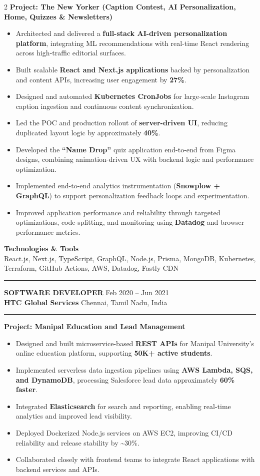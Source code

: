 \documentclass[10pt,a4paper]{article}
\newcommand{\blockdivider}{\vspace{0pt}\color{rulecolor}\rule{\linewidth}{0.5pt}\color{primary}\vspace{4pt}}
\newcommand{\roleheader}[4]{%
  \noindent
  \textbf{\MakeUppercase{#3}}%
  \hfill
  \textcolor{secondary}{#4}\\[0pt]
  \noindent
  \textbf{#1}%
  \hfill
  \textcolor{secondary}{#2}\\[0pt]
}
\newcommand{\roledivider}{%
  \vspace{-1pt}%
  {\color{rulecolor}\rule{\linewidth}{0.5pt}}%
  \vspace{2pt}%
}
\newcommand{\projecttitle}[1]{\textbf{#1}\par\vspace{2pt}}
\begin{document}
\begin{paracol}{2}
\projecttitle{Project: The New Yorker (Caption Contest, AI Personalization, Home, Quizzes \& Newsletters)}
\begin{itemize}
  \item Architected and delivered a \textbf{full-stack AI-driven personalization platform}, integrating ML recommendations with real-time React rendering across high-traffic editorial surfaces.
  \item Built scalable \textbf{React and Next.js applications} backed by personalization and content APIs, increasing user engagement by \textbf{27\%}.
  \item Designed and automated \textbf{Kubernetes CronJobs} for large-scale Instagram caption ingestion and continuous content synchronization.
  \item Led the POC and production rollout of \textbf{server-driven UI}, reducing duplicated layout logic by approximately \textbf{40\%}.
  \item Developed the \textbf{``Name Drop''} quiz application end-to-end from Figma designs, combining animation-driven UX with backend logic and performance optimization.
  \item Implemented end-to-end analytics instrumentation (\textbf{Snowplow + GraphQL}) to support personalization feedback loops and experimentation.
  \item Improved application performance and reliability through targeted optimizations, code-splitting, and monitoring using \textbf{Datadog} and browser performance metrics.
\end{itemize}

\textbf{Technologies \& Tools}\\
React.js, Next.js, TypeScript, GraphQL, Node.js, Prisma, MongoDB, Kubernetes, Terraform, GitHub Actions, AWS, Datadog, Fastly CDN

\blockdivider

\roleheader{HTC Global Services}{Chennai, Tamil Nadu, India}{Software Developer}{Feb 2020 -- Jun 2021}
\roledivider

\projecttitle{Project: Manipal Education and Lead Management}
\begin{itemize}
  \item Designed and built microservice-based \textbf{REST APIs} for Manipal University’s online education platform, supporting \textbf{50K+ active students}.
  \item Implemented serverless data ingestion pipelines using \textbf{AWS Lambda, SQS, and DynamoDB}, processing Salesforce lead data approximately \textbf{60\% faster}.
  \item Integrated \textbf{Elasticsearch} for search and reporting, enabling real-time analytics and improved lead visibility.
  \item Deployed Dockerized Node.js services on AWS EC2, improving CI/CD reliability and release stability by \textasciitilde30\%.
  \item Collaborated closely with frontend teams to integrate React applications with backend services and APIs.
\end{itemize}


\end{paracol}
\end{document}
